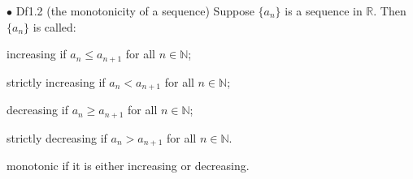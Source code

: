 \documentclass{article}
\begin{document}
\begin{Df}{$\bullet$ Df1.2 (the monotonicity of a sequence)}
    Suppose $\{a_n\}$ is a sequence in $\mathbb{R}$. Then $\{a_n\}$ is called:
    \begin{compactenum}
        \item increasing if $a_n\leq a_{n+1}$ for all $n\in\mathbb{N}$;
        \item strictly increasing if $a_n<a_{n+1}$ for all $n\in\mathbb{N}$;
        \item decreasing if $a_n\geq a_{n+1}$ for all $n\in\mathbb{N}$;
        \item strictly decreasing if $a_n>a_{n+1}$ for all $n\in\mathbb{N}$.
        \item monotonic if it is either increasing or decreasing.
    \end{compactenum}
\end{Df}
\end{document}

